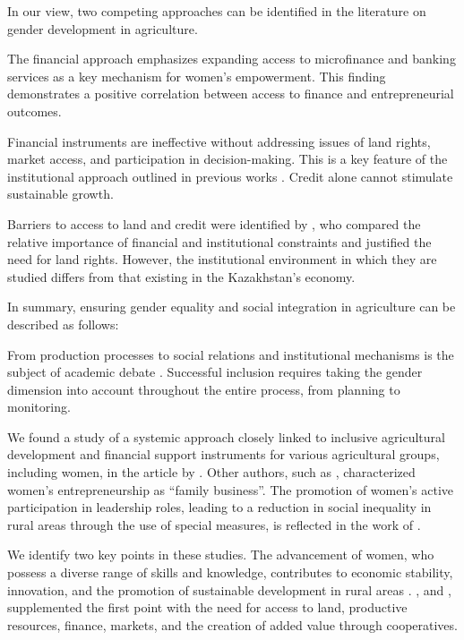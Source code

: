 ﻿\documentclass[pdflatex,sn-mathphys-ay]{sn-jnl}
\begin{document}
In our view, two competing approaches can be identified in the
literature on gender development in agriculture.

The financial approach \citep{ref60,ref88} emphasizes expanding access to microfinance and banking
services as a key mechanism for women's empowerment. This finding demonstrates a
positive correlation between access to finance and entrepreneurial
outcomes.

Financial instruments are ineffective without addressing issues of land
rights, market access, and participation in decision-making. This is a
key feature of the institutional approach outlined in previous works
\citep{ref78,ref26,ref02,ref32,ref36,ref66}. Credit alone
cannot stimulate sustainable growth.

Barriers to access to land and credit were identified by
\citep{ref26,ref20,ref06}, who compared the
relative importance of financial and institutional constraints and
justified the need for land rights. However, the institutional
environment in which they are studied differs from that existing in the
Kazakhstan's economy.

In summary, ensuring gender equality and social integration in
agriculture can be described as follows:

From production processes to social relations and institutional
mechanisms is the subject of academic debate \citep{ref78,ref93,ref04}. Successful inclusion
requires taking the gender dimension into account throughout the entire
process, from planning to monitoring.

We found a study of a systemic approach closely linked to inclusive
agricultural development and financial support instruments for various
agricultural groups, including women, in the article by \citet{ref48}. Other authors, such as \citet{ref11},
characterized women's entrepreneurship as ``family business''. The
promotion of women's active participation in leadership roles, leading
to a reduction in social inequality in rural areas through the use of
special measures, is reflected in the work of \citet{ref82}.

We identify two key points in these studies. The advancement of women,
who possess a diverse range of skills and knowledge, contributes to
economic stability, innovation, and the promotion of sustainable
development in rural areas \citep{ref82}. \citet{ref75}, and \citet{ref02}, supplemented the first point
with the need for access to land, productive resources, finance,
markets, and the creation of added value through cooperatives.
\end{document}
